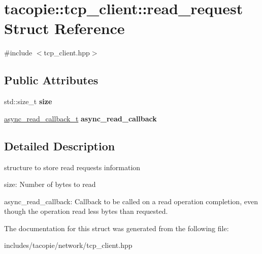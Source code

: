 \hypertarget{structtacopie_1_1tcp__client_1_1read__request}{}\section{tacopie\+:\+:tcp\+\_\+client\+:\+:read\+\_\+request Struct Reference}
\label{structtacopie_1_1tcp__client_1_1read__request}


{\ttfamily \#include $<$tcp\+\_\+client.\+hpp$>$}

\subsection*{Public Attributes}
\begin{DoxyCompactItemize}
\item 
\mbox{\label{structtacopie_1_1tcp__client_1_1read__request_ad8b69f61884c60596aface363ca947a3}} 
std\+::size\+\_\+t {\bfseries size}
\item 
\mbox{\label{structtacopie_1_1tcp__client_1_1read__request_a3d495e82e38efebf763f595392b0db46}} 
\hyperlink{classtacopie_1_1tcp__client_acdf9dea8bac6c56f7b04ce38b9432322}{async\+\_\+read\+\_\+callback\+\_\+t} {\bfseries async\+\_\+read\+\_\+callback}
\end{DoxyCompactItemize}


\subsection{Detailed Description}
structure to store read requests information
\begin{DoxyItemize}
\item size\+: Number of bytes to read
\item async\+\_\+read\+\_\+callback\+: Callback to be called on a read operation completion, even though the operation read less bytes than requested. 
\end{DoxyItemize}

The documentation for this struct was generated from the following file\+:\begin{DoxyCompactItemize}
\item 
includes/tacopie/network/tcp\+\_\+client.\+hpp\end{DoxyCompactItemize}
